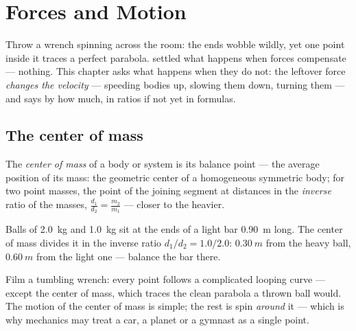 \chapter{Forces and Motion}\label{ch:g11:forces-and-motion}

Throw a wrench spinning across the room: the ends wobble wildly, yet
one point inside it traces a perfect parabola. 
settled what happens when forces compensate --- nothing. This chapter
asks what happens when they do not: the leftover force \emph{changes
the velocity} --- speeding bodies up, slowing them down, turning them
--- and says by how much, in ratios if not yet in formulas.

\section{The center of mass}

\begin{definition}\label{def:g11:forces-and-motion:com}
The \emph{center of mass} of a body or system is
its balance point --- the average position of its mass: the geometric
center of a homogeneous symmetric body; for two point masses, the point
of the joining segment at distances in the \emph{inverse} ratio of the
masses, $\frac{d_1}{d_2} = \frac{m_2}{m_1}$ --- closer to the heavier.
\end{definition}

\begin{example}\label{ex:g11:forces-and-motion:dumbbell}
Balls of \qty{2.0}{kg} and \qty{1.0}{kg} sit at the ends of a light bar
\qty{0.90}{m} long. The center of mass divides it in the inverse ratio
$d_1/d_2 = 1.0/2.0$: $\qty{0.30}{m}$ from the heavy ball,
$\qty{0.60}{m}$ from the light one --- balance the bar there.
\end{example}

\begin{remark}\label{rem:g11:forces-and-motion:wrench}
Film a tumbling wrench: every point follows a complicated looping curve
--- except the center of mass, which traces the clean parabola a thrown
ball would. The motion of the center of mass is simple; the rest is spin
\emph{around} it --- which is why mechanics may treat a car, a planet or
a gymnast as a single point.
\end{remark}

